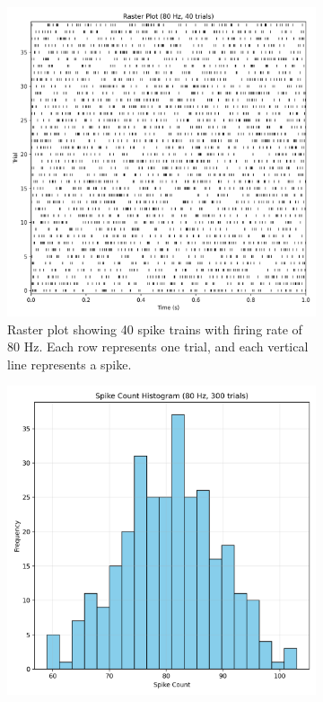 \documentclass{article}
\begin{document}
\begin{figure}[H]
\centering
\begin{subfigure}{0.48\textwidth}
    \includegraphics[width=\textwidth]{Fig2a.png}
    \caption{Raster plot showing 40 spike trains with firing rate of 80 Hz. Each row represents one trial, and each vertical line represents a spike.}
    \label{fig:raster_plot}
\end{subfigure}
\hfill
\begin{subfigure}{0.48\textwidth}
    \includegraphics[width=\textwidth]{Fig2b.png}

\end{subfigure}
\end{figure}
\end{document}
